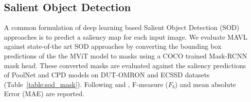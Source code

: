 \documentclass[runningheads]{llncs}
\begin{document}
\subsection{Salient Object Detection}\label{app:add_results_sod}
A common formulation of deep learning based Salient Object Detection (SOD) approaches is to predict a saliency map for each input image. We evaluate MAVL against state-of-the art SOD approaches by converting the bounding box predictions of the the MViT model to masks using a COCO \cite{coco} trained Mask-RCNN \cite{he2017mask} mask head. These converted masks are evaluated against the saliency predictions of PoolNet \cite{liu2019simple} and CPD \cite{wu2019cascaded} models on DUT-OMRON \cite{yang2013saliency} and ECSSD \cite{shi2015hierarchical} datasets (Table~\ref{table:sod_mask}). Following \cite{liu2019simple} and \cite{wu2019cascaded}, F-measure ($F_b$) and mean absolute Error (MAE) are reported. 
\end{document}
